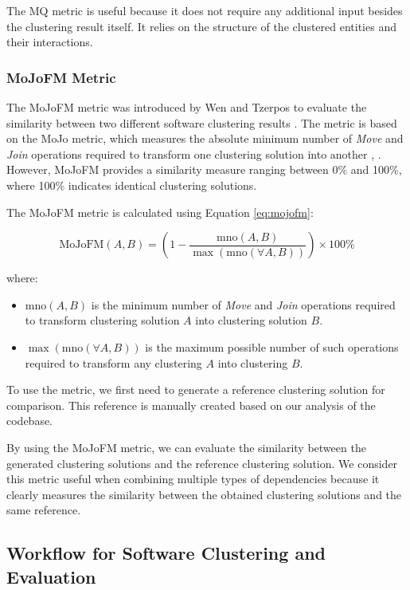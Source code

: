 \documentclass{ieeeaccess}
\begin{document}
The MQ metric is useful because it does not require any additional input besides the clustering result itself. It relies on the structure of the clustered entities and their interactions. 

\subsubsection{MoJoFM Metric}
The MoJoFM metric was introduced by Wen and Tzerpos to evaluate the similarity between two different software clustering results \cite{mojofm}. The metric is based on the MoJo metric, which measures the absolute minimum number of \textit{Move} and \textit{Join} operations required to transform one clustering solution into another \cite{b3}, \cite{b11}. However, MoJoFM provides a similarity measure ranging between 0\% and 100\%, where 100\% indicates identical clustering solutions.

The MoJoFM metric is calculated using Equation \eqref{eq:mojofm}:

\begin{equation} 
\text{MoJoFM}(A, B) = \left(1 - \frac{\text{mno}(A, B)}{\max(\text{mno}(\forall A, B))}\right) \times 100\%
\label{eq:mojofm}
\end{equation}

where:

\begin{itemize}
    \item $\text{mno}(A, B)$ is the minimum number of \textit{Move} and \textit{Join} operations required to transform clustering solution $A$ into clustering solution $B$.
    \item $\max(\text{mno}(\forall A, B))$ is the maximum possible number of such operations required to transform any clustering $A$ into clustering $B$.
\end{itemize}

To use the metric, we first need to generate a reference clustering solution for comparison. This reference is manually created based on our analysis of the codebase.

By using the MoJoFM metric, we can evaluate the similarity between the generated clustering solutions and the reference clustering solution. We consider this metric useful when combining multiple types of dependencies because it clearly measures the similarity between the obtained clustering solutions and the same reference.


\subsection{Workflow for Software Clustering and Evaluation}
\label{subsec:tool_workflow}
\end{document}
